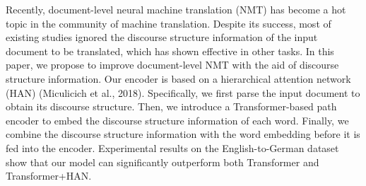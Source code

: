 Recently, document-level neural machine translation (NMT) has become a hot topic in the community of machine translation. Despite its success, most of existing studies ignored the discourse structure information of the input document to be translated, which has shown effective in other tasks. In this paper, we propose to improve document-level NMT with the aid of discourse structure information. Our encoder is based on a hierarchical attention network (HAN) (Miculicich et al., 2018). Specifically, we first parse the input document to obtain its discourse structure. Then, we introduce a Transformer-based path encoder to embed the discourse structure information of each word. Finally, we combine the discourse structure information with the word embedding before it is fed into the encoder. Experimental results on the English-to-German dataset show that our model can significantly outperform both Transformer and Transformer+HAN.
